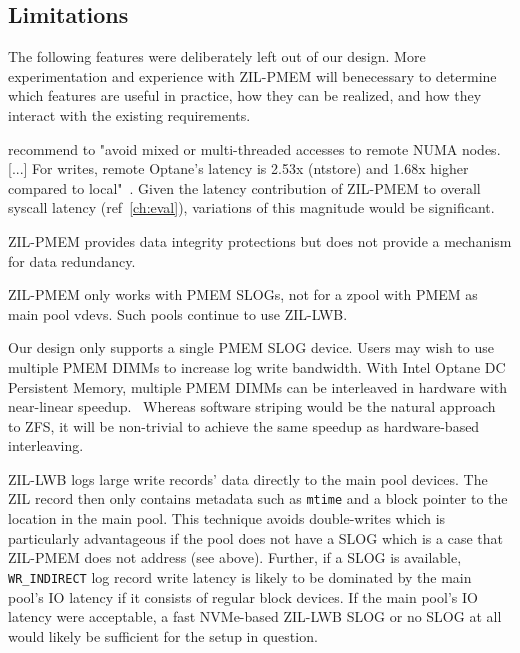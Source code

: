 \documentclass[12pt,a4paper,twoside]{book}
\begin{document}
\subsection{Limitations}
The following features were deliberately left out of our design.
More experimentation and experience with ZIL-PMEM will benecessary to determine which features are useful in practice, how they can be realized, and how they interact with the existing requirements.

\citeauthor{yangEmpiricalGuideBehavior2020} recommend to "avoid mixed or multi-threaded accesses to remote NUMA nodes. [...]  For writes, remote Optane’s latency is 2.53x (ntstore) and 1.68x higher compared to local"~\cite{yangEmpiricalGuideBehavior2020}.
Given the latency contribution of ZIL-PMEM to overall syscall latency (ref~\ref{ch:eval}), variations of this magnitude would be significant.

ZIL-PMEM provides data integrity protections but does not provide a mechanism for data redundancy.

ZIL-PMEM only works with PMEM SLOGs, not for a zpool with PMEM as main pool vdevs.
Such pools continue to use ZIL-LWB.

Our design only supports a single PMEM SLOG device.
Users may wish to use multiple PMEM DIMMs to increase log write bandwidth.
With Intel Optane DC Persistent Memory, multiple PMEM DIMMs can be interleaved in hardware with near-linear speedup.~\cite{yangEmpiricalGuideBehavior2020}
Whereas software striping would be the natural approach to ZFS, it will be non-trivial to achieve the same speedup as hardware-based interleaving.

ZIL-LWB logs large write records' data directly to the main pool devices.
The ZIL record then only contains metadata such as \lstinline{mtime} and a block pointer to the location in the main pool.
This technique avoids double-writes which is particularly advantageous if the pool does not have a SLOG which is a case that ZIL-PMEM does not address (see above).
Further, if a SLOG is available, \lstinline{WR_INDIRECT} log record write latency is likely to be dominated by the main pool's IO latency if it consists of regular block devices.
If the main pool's IO latency were acceptable, a fast NVMe-based ZIL-LWB SLOG or no SLOG at all would likely be sufficient for the setup in question.
\end{document}
